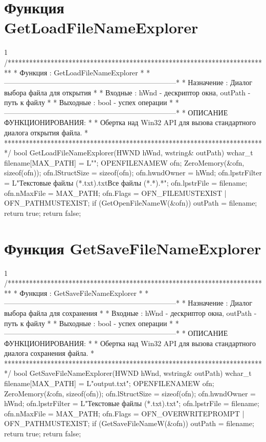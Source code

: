 \section{Функция GetLoadFileNameExplorer}
\footnotesize
\begin{listing}{1}
/*************************************************************************
* Функция       : GetLoadFileNameExplorer                                *
*------------------------------------------------------------------------*
* Назначение    : Диалог выбора файла для открытия                       *
* Входные       : hWnd - дескриптор окна, outPath - путь к файлу         *
* Выходные      : bool - успех операции                                  *
*------------------------------------------------------------------------*
* ОПИСАНИЕ ФУНКЦИОНИРОВАНИЯ:                                             *
* Обертка над Win32 API для вызова стандартного диалога открытия файла.  *
*************************************************************************/
bool GetLoadFileNameExplorer(HWND hWnd, wstring& outPath) {
    wchar_t filename[MAX_PATH] = L""; 
    OPENFILENAMEW ofn; 
    ZeroMemory(&ofn, sizeof(ofn));
    ofn.lStructSize = sizeof(ofn); 
    ofn.hwndOwner = hWnd;
    ofn.lpstrFilter = L"Текстовые файлы (*.txt)\0*.txt\0Все файлы (*.*)\0*.*\0";
    ofn.lpstrFile = filename; 
    ofn.nMaxFile = MAX_PATH;
    ofn.Flags = OFN_FILEMUSTEXIST | OFN_PATHMUSTEXIST;
    if (GetOpenFileNameW(&ofn)) { 
        outPath = filename; 
        return true; 
    }
    return false;
}
\end{listing}
\normalsize

\pagebreak

\section{Функция GetSaveFileNameExplorer}
\footnotesize
\begin{listing}{1}
/*************************************************************************
* Функция       : GetSaveFileNameExplorer                                *
*------------------------------------------------------------------------*
* Назначение    : Диалог выбора файла для сохранения                     *
* Входные       : hWnd - дескриптор окна, outPath - путь к файлу         *
* Выходные      : bool - успех операции                                  *
*------------------------------------------------------------------------*
* ОПИСАНИЕ ФУНКЦИОНИРОВАНИЯ:                                             *
* Обертка над Win32 API для вызова стандартного диалога сохранения файла. *
*************************************************************************/
bool GetSaveFileNameExplorer(HWND hWnd, wstring& outPath) {
    wchar_t filename[MAX_PATH] = L"output.txt"; 
    OPENFILENAMEW ofn; 
    ZeroMemory(&ofn, sizeof(ofn));
    ofn.lStructSize = sizeof(ofn); 
    ofn.hwndOwner = hWnd;
    ofn.lpstrFilter = L"Текстовые файлы (*.txt)\0*.txt\0";
    ofn.lpstrFile = filename; 
    ofn.nMaxFile = MAX_PATH;
    ofn.Flags = OFN_OVERWRITEPROMPT | OFN_PATHMUSTEXIST;
    if (GetSaveFileNameW(&ofn)) { 
        outPath = filename; 
        return true; 
    }
    return false;
}
\end{listing}
\normalsize

